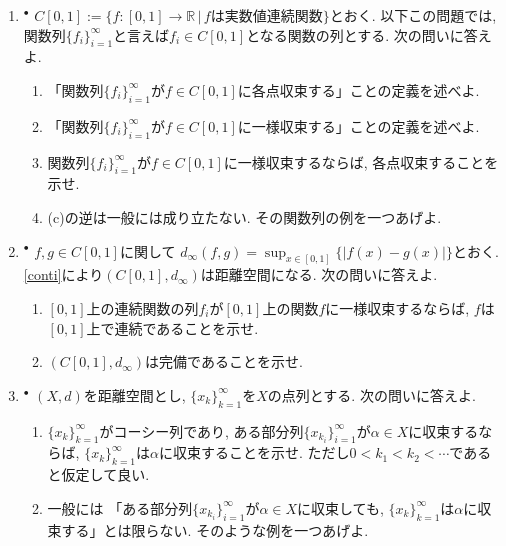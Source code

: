 \documentclass[dvipdfmx,a4paper,11pt]{article}
\newcommand{\R}{\mathbb{R}}
\theoremstyle{definition}
\begin{document}
\begin{enumerate}[label=\textbf{問}\ref*{sec-completion}.\arabic*]
	\setlength{\parskip}{0cm} 
  \setlength{\itemsep}{7pt} 


\item \label{uniform} $^{\bullet}$  $C[0,1] := \{ f : [0,1] \rightarrow \R \,|\, \text{$f$は実数値連続関数}\}$とおく. 以下この問題では, 関数列$\{ f_{i}\}_{i=1}^{\infty}$と言えば$f_i \in C[0,1]$となる関数の列とする. 次の問いに答えよ.
\begin{enumerate}
\setlength{\parskip}{0cm}
  \setlength{\itemsep}{0pt} 
\item 「関数列$\{ f_{i}\}_{i=1}^{\infty}$が$f \in C[0,1]$に各点収束する」ことの定義を述べよ.
\item 「関数列$\{ f_{i}\}_{i=1}^{\infty}$が$f \in C[0,1]$に一様収束する」ことの定義を述べよ. 
\item 関数列$\{ f_{i}\}_{i=1}^{\infty}$が$f \in C[0,1]$に一様収束するならば, 各点収束することを示せ. 
\item (c)の逆は一般には成り立たない. その関数列の例を一つあげよ.
\end{enumerate}

\item $^{\bullet}$  \label{uniform_2}$f,g \in C[0,1]$に関して
$
d_{\infty}(f,g)=\sup_{x \in [0,1] }\{ |f(x) - g(x)|\}
$とおく.
\ref{conti}により$(C[0,1], d_{\infty})$は距離空間になる. 
次の問いに答えよ.
\begin{enumerate}
\setlength{\parskip}{0cm}
  \setlength{\itemsep}{0pt} 
  \item $[0,1]$上の連続関数の列$f_{i}$が$[0,1]$上の関数$f$に一様収束するならば, $f$は$[0,1]$上で連続であることを示せ. 
\item $(C[0,1], d_{\infty})$は完備であることを示せ.
\end{enumerate}

\item $^{\bullet}$  $(X,d)$を距離空間とし, $\{ x_{k}\}_{k=1}^{\infty}$を$X$の点列とする. 次の問いに答えよ.
\begin{enumerate}
\setlength{\parskip}{0cm}
  \setlength{\itemsep}{0pt} 
 \item $\{ x_{k}\}_{k=1}^{\infty}$がコーシー列であり, ある部分列$\{ x_{k_{i}}\}_{i=1}^{\infty}$が$\alpha \in X$に収束するならば, $\{ x_{k}\}_{k=1}^{\infty}$は$\alpha$に収束することを示せ. ただし$0<k_1<k_2<\cdots$であると仮定して良い. 
 \item 一般には 「ある部分列$\{ x_{k_{i}}\}_{i=1}^{\infty}$が$\alpha \in X$に収束しても, $\{ x_{k}\}_{k=1}^{\infty}$は$\alpha$に収束する」とは限らない. そのような例を一つあげよ. 
  \end{enumerate}


\end{enumerate}
\end{document}
